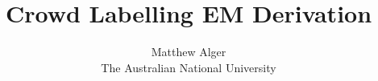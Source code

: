 \documentclass[a4paper]{article}
\begin{document}
    \title{Crowd Labelling EM Derivation}
    \author{Matthew Alger\\The Australian National University}
    \maketitle

    

    
    
\end{document}

